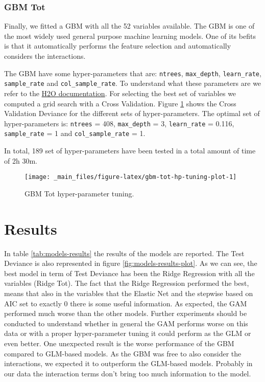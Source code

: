 \documentclass[a4paper, twoside, openright, 12pt]{report}
\theoremstyle{definition}
\theoremstyle{definition}
\theoremstyle{definition}
\theoremstyle{remark}
\begin{document}
\hypertarget{gbm-tot}{%
\subsubsection{GBM Tot}\label{gbm-tot}}

Finally, we fitted a GBM with all the 52 variables available. The GBM is one of the most widely used general purpose machine learning models. One of its befits is that it automatically performs the feature selection and automatically considers the interactions.

The GBM have some hyper-parameters that are: \texttt{ntrees}, \texttt{max\_depth}, \texttt{learn\_rate}, \texttt{sample\_rate} and \texttt{col\_sample\_rate}. To understand what these parameters are we refer to the \href{http://docs.h2o.ai/h2o/latest-stable/h2o-docs/data-science/gbm.html}{H2O documentation}. For selecting the best set of variables we computed a grid search with a Cross Validation. Figure \ref{fig:gbm-tot-hp-tuning-plot} shows the Cross Validation Deviance for the different sets of hyper-parameters. The optimal set of hyper-parameters is:
\texttt{ntrees} = 408,
\texttt{max\_depth} = 3,
\texttt{learn\_rate} = 0.116,
\texttt{sample\_rate} = 1 and
\texttt{col\_sample\_rate} = 1.

In total, 189 set of hyper-parameters have been tested in a total amount of time of 2h 30m.





\begin{figure}[!hbtp]

{\centering \texttt{[image: \_main\_files/figure-latex/gbm-tot-hp-tuning-plot-1]} 

}

\caption[GBM Tot hyper-parameter tuning.]{GBM Tot hyper-parameter tuning.}\label{fig:gbm-tot-hp-tuning-plot}
\end{figure}

\newpage

\hypertarget{chap:results}{%
\section{Results}\label{chap:results}}

In table \ref{tab:models-results} the results of the models are reported. The Test Deviance is also represented in figure \ref{fig:models-results-plot}. As we can see, the best model in term of Test Deviance has been the Ridge Regression with all the variables (Ridge Tot). The fact that the Ridge Regression performed the best, means that also in the variables that the Elastic Net and the stepwise based on AIC set to exactly 0 there is some useful information. As expected, the GAM performed much worse than the other models. Further experiments should be conducted to understand whether in general the GAM performs worse on this data or with a proper hyper-parameter tuning it could perform as the GLM or even better. One unexpected result is the worse performance of the GBM compared to GLM-based models. As the GBM was free to also consider the interactions, we expected it to outperform the GLM-based models. Probably in our data the interaction terms don't bring too much information to the model.
\end{document}
